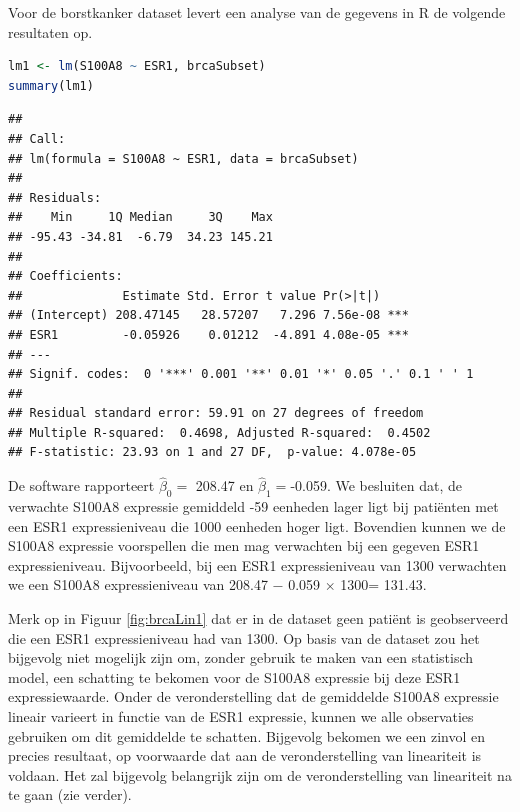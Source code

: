 \documentclass[
  12pt,dutch,coursenotes]{book}
\theoremstyle{definition}
\theoremstyle{definition}
\theoremstyle{definition}
\theoremstyle{definition}
\theoremstyle{remark}
\begin{document}
Voor de borstkanker dataset levert een analyse van de gegevens in R de volgende resultaten op.

\begin{lstlisting}[language=R]
lm1 <- lm(S100A8 ~ ESR1, brcaSubset)
summary(lm1)
\end{lstlisting}

\begin{lstlisting}
## 
## Call:
## lm(formula = S100A8 ~ ESR1, data = brcaSubset)
## 
## Residuals:
##    Min     1Q Median     3Q    Max 
## -95.43 -34.81  -6.79  34.23 145.21 
## 
## Coefficients:
##              Estimate Std. Error t value Pr(>|t|)    
## (Intercept) 208.47145   28.57207   7.296 7.56e-08 ***
## ESR1         -0.05926    0.01212  -4.891 4.08e-05 ***
## ---
## Signif. codes:  0 '***' 0.001 '**' 0.01 '*' 0.05 '.' 0.1 ' ' 1
## 
## Residual standard error: 59.91 on 27 degrees of freedom
## Multiple R-squared:  0.4698, Adjusted R-squared:  0.4502 
## F-statistic: 23.93 on 1 and 27 DF,  p-value: 4.078e-05
\end{lstlisting}

De software rapporteert \(\hat{\beta}_0=\) 208.47 en \(\hat{\beta}_1=\)-0.059. We besluiten dat, de verwachte S100A8 expressie gemiddeld -59 eenheden lager ligt bij patiënten met een ESR1 expressieniveau die 1000 eenheden hoger ligt.
Bovendien kunnen we de S100A8 expressie voorspellen die men mag verwachten bij een gegeven ESR1 expressieniveau. Bijvoorbeeld, bij een ESR1 expressieniveau van 1300 verwachten we een S100A8 expressieniveau van 208.47 \(-\) 0.059 \(\times\) 1300= 131.43.

Merk op in Figuur \ref{fig:brcaLin1} dat er in de dataset geen patiënt is geobserveerd die een ESR1 expressieniveau had van 1300. Op basis van de dataset zou het bijgevolg niet mogelijk zijn om, zonder gebruik te maken van een statistisch model, een schatting te bekomen voor de S100A8 expressie bij deze ESR1 expressiewaarde. Onder de veronderstelling dat de gemiddelde S100A8 expressie lineair varieert in functie van de ESR1 expressie, kunnen we alle observaties gebruiken om dit gemiddelde te schatten. Bijgevolg bekomen we een zinvol en precies resultaat, op voorwaarde dat aan de veronderstelling van lineariteit is voldaan. Het zal bijgevolg belangrijk zijn om de veronderstelling van lineariteit na te gaan (zie verder).
\end{document}
